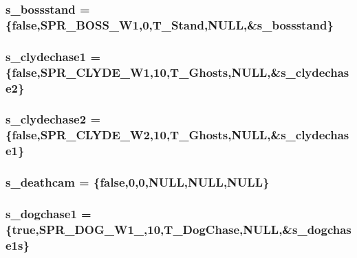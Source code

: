 \label{WL__ACT2_8C_af95404f552d02a0cdc0e3f8b8905018d}
\hypertarget{WL__ACT2_8C_a277ee30ec0f5bb15e1905e1aa40ecd20}{
\subsubsection[{s\_\-bossstand}]{ {\bf s\_\-bossstand} = \{false,SPR\_\-BOSS\_\-W1,0,T\_\-Stand,NULL,\&{\bf s\_\-bossstand}\}}}
\label{WL__ACT2_8C_a277ee30ec0f5bb15e1905e1aa40ecd20}
\hypertarget{WL__ACT2_8C_afdb3014d4251698197d83f989176804c}{
\subsubsection[{s\_\-clydechase1}]{ {\bf s\_\-clydechase1} = \{false,SPR\_\-CLYDE\_\-W1,10,T\_\-Ghosts,NULL,\&{\bf s\_\-clydechase2}\}}}
\label{WL__ACT2_8C_afdb3014d4251698197d83f989176804c}
\hypertarget{WL__ACT2_8C_a69193db0a2f4dee2e110b851f6fe2146}{
\subsubsection[{s\_\-clydechase2}]{ {\bf s\_\-clydechase2} = \{false,SPR\_\-CLYDE\_\-W2,10,T\_\-Ghosts,NULL,\&{\bf s\_\-clydechase1}\}}}
\label{WL__ACT2_8C_a69193db0a2f4dee2e110b851f6fe2146}
\hypertarget{WL__ACT2_8C_a7f671914a2f6c20217c29103a1dca042}{
\subsubsection[{s\_\-deathcam}]{ {\bf s\_\-deathcam} = \{false,0,0,NULL,NULL,NULL\}}}
\label{WL__ACT2_8C_a7f671914a2f6c20217c29103a1dca042}
\hypertarget{WL__ACT2_8C_a50a4f7d61d6b2fe4fb9a477b1ac624e7}{
\subsubsection[{s\_\-dogchase1}]{ {\bf s\_\-dogchase1} = \{true,SPR\_\-DOG\_\-W1\_,10,T\_\-DogChase,NULL,\&{\bf s\_\-dogchase1s}\}}}
